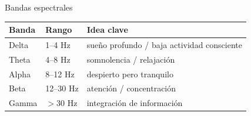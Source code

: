 \begin{frame}{Bandas espectrales}
    \centering
    \renewcommand{\arraystretch}{1.22}
    \begin{tabular}{lll}
        \toprule
        \textbf{Banda} & \textbf{Rango} & \textbf{Idea clave} \\
        \midrule
        Delta & 1--4 Hz & sueño profundo / baja actividad consciente \\
        Theta & 4--8 Hz & somnolencia / relajación \\
        Alpha & 8--12 Hz & despierto pero tranquilo \\
        Beta & 12--30 Hz & atención / concentración \\
        Gamma & \(>30\) Hz & integración de información \\
        \bottomrule
    \end{tabular}

    \vspace{0.55cm}
\end{frame}

